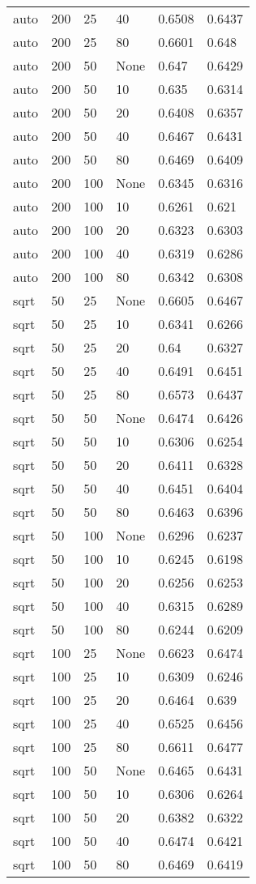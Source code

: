 \documentclass{article}%
\begin{document}
\begin{longtable}{l l l l l l}
auto&200&25&40&0.6508&0.6437\\%
auto&200&25&80&0.6601&0.648\\%
auto&200&50&None&0.647&0.6429\\%
auto&200&50&10&0.635&0.6314\\%
auto&200&50&20&0.6408&0.6357\\%
auto&200&50&40&0.6467&0.6431\\%
auto&200&50&80&0.6469&0.6409\\%
auto&200&100&None&0.6345&0.6316\\%
auto&200&100&10&0.6261&0.621\\%
auto&200&100&20&0.6323&0.6303\\%
auto&200&100&40&0.6319&0.6286\\%
auto&200&100&80&0.6342&0.6308\\%
sqrt&50&25&None&0.6605&0.6467\\%
sqrt&50&25&10&0.6341&0.6266\\%
sqrt&50&25&20&0.64&0.6327\\%
sqrt&50&25&40&0.6491&0.6451\\%
sqrt&50&25&80&0.6573&0.6437\\%
sqrt&50&50&None&0.6474&0.6426\\%
sqrt&50&50&10&0.6306&0.6254\\%
sqrt&50&50&20&0.6411&0.6328\\%
sqrt&50&50&40&0.6451&0.6404\\%
sqrt&50&50&80&0.6463&0.6396\\%
sqrt&50&100&None&0.6296&0.6237\\%
sqrt&50&100&10&0.6245&0.6198\\%
sqrt&50&100&20&0.6256&0.6253\\%
sqrt&50&100&40&0.6315&0.6289\\%
sqrt&50&100&80&0.6244&0.6209\\%
sqrt&100&25&None&0.6623&0.6474\\%
sqrt&100&25&10&0.6309&0.6246\\%
sqrt&100&25&20&0.6464&0.639\\%
sqrt&100&25&40&0.6525&0.6456\\%
sqrt&100&25&80&0.6611&0.6477\\%
sqrt&100&50&None&0.6465&0.6431\\%
sqrt&100&50&10&0.6306&0.6264\\%
sqrt&100&50&20&0.6382&0.6322\\%
sqrt&100&50&40&0.6474&0.6421\\%
sqrt&100&50&80&0.6469&0.6419\\%

\end{longtable}
\end{document}
